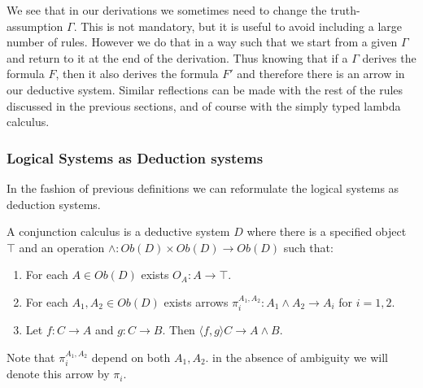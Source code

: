 We see that in our derivations we sometimes need to change the truth-assumption $\Gamma$. This is not mandatory, but it is useful to avoid including a large number of rules. However we do that in a way such that we start from a given $\Gamma$ and return to it at the end of the derivation. Thus knowing that if a $\Gamma$ derives the formula $F$, then it also derives the formula $F'$ and therefore there is an arrow in our deductive system. Similar reflections can be made with the rest of the rules discussed in the previous sections, and of course with the simply typed lambda calculus. \\



\subsubsection{Logical Systems as Deduction systems}
In  the fashion of previous definitions we can reformulate the logical systems as deduction systems.\\
\begin{definition}
  A conjunction calculus is a deductive system $D$ where there is a specified object $\top$ and an operation $\land: Ob(D)\times Ob(D) \to Ob(D)$ such that:
  \begin{enumerate}
  \item For each $A\in Ob(D)$ exists $O_A:A\to \top$.
  \item For each $A_1,A_2\in Ob(D)$ exists arrows $\pi_i^{A_1,A_2}: A_1 \land A_2 \to A_i$ for $i=1,2$.
  \item Let $f:C\to A$ and $g:C\to B$. Then $\langle f,g\rangle C\to A\land B$.
  \end{enumerate}
\end{definition}

Note that $\pi_i^{A_1,A_2}$ depend on both $A_1,A_2$. in the absence of ambiguity we will denote this arrow by $\pi_i$.

